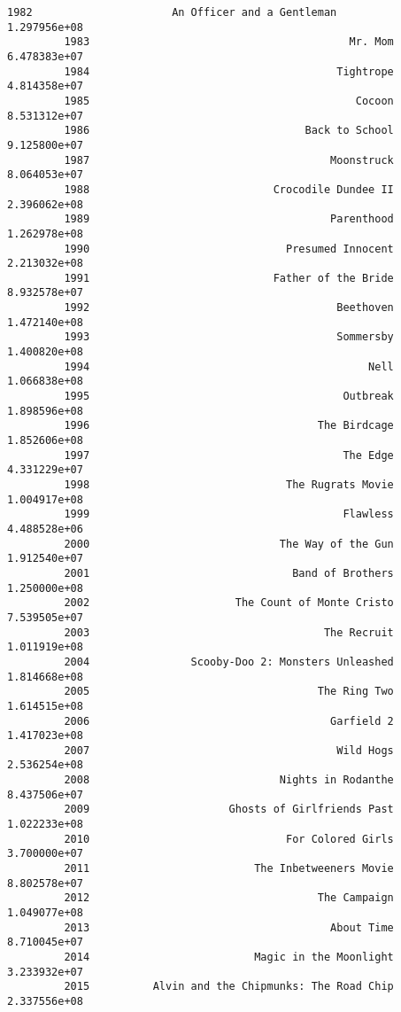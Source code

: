 \documentclass[11pt]{article}
\begin{document}
\begin{Verbatim}[commandchars=\\\{\}]
         1982                      An Officer and a Gentleman             1.297956e+08
         1983                                         Mr. Mom             6.478383e+07
         1984                                       Tightrope             4.814358e+07
         1985                                          Cocoon             8.531312e+07
         1986                                  Back to School             9.125800e+07
         1987                                      Moonstruck             8.064053e+07
         1988                             Crocodile Dundee II             2.396062e+08
         1989                                      Parenthood             1.262978e+08
         1990                               Presumed Innocent             2.213032e+08
         1991                             Father of the Bride             8.932578e+07
         1992                                       Beethoven             1.472140e+08
         1993                                       Sommersby             1.400820e+08
         1994                                            Nell             1.066838e+08
         1995                                        Outbreak             1.898596e+08
         1996                                    The Birdcage             1.852606e+08
         1997                                        The Edge             4.331229e+07
         1998                               The Rugrats Movie             1.004917e+08
         1999                                        Flawless             4.488528e+06
         2000                              The Way of the Gun             1.912540e+07
         2001                                Band of Brothers             1.250000e+08
         2002                       The Count of Monte Cristo             7.539505e+07
         2003                                     The Recruit             1.011919e+08
         2004                Scooby-Doo 2: Monsters Unleashed             1.814668e+08
         2005                                    The Ring Two             1.614515e+08
         2006                                      Garfield 2             1.417023e+08
         2007                                       Wild Hogs             2.536254e+08
         2008                              Nights in Rodanthe             8.437506e+07
         2009                      Ghosts of Girlfriends Past             1.022233e+08
         2010                               For Colored Girls             3.700000e+07
         2011                          The Inbetweeners Movie             8.802578e+07
         2012                                    The Campaign             1.049077e+08
         2013                                      About Time             8.710045e+07
         2014                          Magic in the Moonlight             3.233932e+07
         2015          Alvin and the Chipmunks: The Road Chip             2.337556e+08
\end{Verbatim}
            
\end{document}
